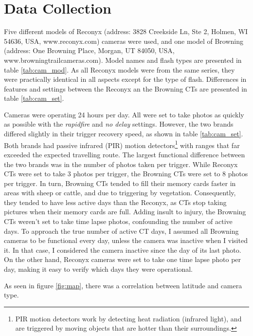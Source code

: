\section{Data Collection} 


Five different models of Reconyx (address: 3828 Creekside Ln, Ste 2, Holmen, WI 54636, USA, www.reconyx.com) cameras were used, 
and one model of Browning (address: One Browning Place, Morgan, UT 84050, USA, www.browningtrailcameras.com).
Model names and flash types are presented in table \ref{tab:cam_mod}.  
As all Reconyx models were from the same series, they were practically identical in all aspects except for the type of flash. Differences in features and settings between the Reconyx an the Browning CTs are presented in table \ref{tab:cam_set}.


Cameras were operating 24 hours per day. All were set to take photos as quickly as possible with the \emph{rapidfire} and \emph{no delay} settings. However, the two brands differed slightly in their trigger recovery speed, as shown in table \ref{tab:cam_set}.
Both brands had passive infrared (PIR) motion detectors\footnote{PIR motion detectors work by detecting heat radiation (infrared light), and are triggered by moving objects that are hotter than their surroundings.} 
with ranges that far exceeded the expected travelling route. 
The largest functional difference between the two brands was in the number of photos taken per trigger. 
While Reconyx CTs were set to take 3 photos per trigger, the Browning CTs were set to 8 photos per trigger. In turn, Browning CTs tended to fill their memory cards faster in areas with sheep or cattle, and due to triggering by vegetation.
Consequently, they tended to have less active days than the Reconyx, as CTs stop taking pictures when their memory cards are full.
Adding insult to injury, the Browning CTs weren't set to take time lapse photos, confounding the number of active days.
To approach the true number of active CT days, I assumed all Browning cameras to be functional every day, unless the camera was inactive when I visited it. In that case, I considered the camera inactive since the day of its last photo.
On the other hand, Reconyx cameras were set to take one time lapse photo per day, making it easy to verify which days they were operational.






As seen in figure \ref{fig:map}, %
there was a correlation between latitude and camera type.


